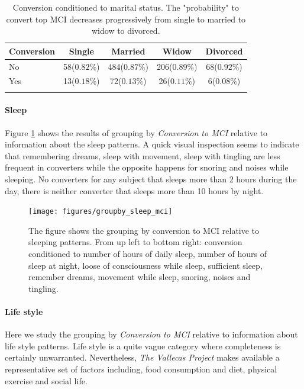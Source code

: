 \documentclass[11pt]{article}
\theoremstyle{definition}
\theoremstyle{remark}
\begin{document}
\begin{table}[ht]
\centering
\caption{Conversion conditioned to marital status. The "probability" to convert top MCI decreases progressively from single to married to widow to divorced.}
\begin{tabular}[t]{lcccc}
\hline
Conversion&Single&Married&Widow&Divorced \\
\hline
No&58($0.82\%$)&484($0.87\%$)&206($0.89\%$)&68($0.92\%$)\\
Yes&13($0.18\%$)&72($0.13\%$)&26($0.11\%$)&6($0.08\%$)\\
\hline
\label{tab:marital}
\end{tabular}
\end{table}%

\paragraph*{Sleep}

Figure \ref{fig:groupby_sleep_mci} shows the results of grouping by \emph{Conversion to MCI} relative to information about the sleep patterns. A quick visual inspection seems to indicate that remembering dreams, sleep with movement, sleep with tingling are less frequent in converters while the opposite happens for snoring and noises while sleeping. No converters for any subject that sleeps more than 2 hours during the day, there is neither converter that sleeps more than 10 hours by night.

\begin{figure}[H]
        \centering
        \texttt{[image: figures/groupby\_sleep\_mci]}
        \caption{The figure shows the grouping by conversion to MCI relative to sleeping patterns. From up left to bottom right: conversion conditioned to number of hours of daily sleep, number of hours of sleep at night, loose of consciousness while sleep, sufficient sleep, remember dreams, movement while sleep, snoring, noises and tingling.} 
        \label{fig:groupby_sleep_mci}
\end{figure}


\paragraph*{Life style}
Here we study the grouping by \emph{Conversion to MCI} relative to information about life style patterns. Life style is a quite vague  category where completeness is certainly unwarranted. Nevertheless, \emph{The Vallecas Project} makes available a representative set of factors including, food consumption and diet, physical exercise and social life.
\end{document}
